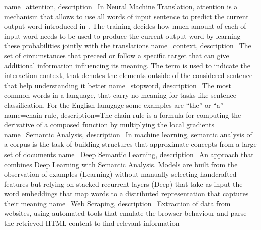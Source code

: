 
{
  name={attention},
  description={In Neural Machine Translation, attention is a mechanism that allows to use all words of input sentence to predict the current output word introduced in \cite{bahdanau2014neural}. The training decides how much amount of each of input word needs to be used to produce the current output word by learning these probabilities jointly with the translations}
}
{
  name={context},
  description={The set of circumstances that preceed or follow a specific target that can give additional information influencing its meaning. The term is used to indicate the interaction context, that denotes the elements outside of the considered sentence that help understanding it better}
}
{
  name={stopword},
  description={The most common words in a language, that carry no meaning for tasks like sentence classification. For the English lanugage some examples are ``the'' or ``a''}
}
{
  name={chain rule},
  description={The chain rule is a formula for computing the derivative of a composed function by multiplying the local gradients}
}
{
  name={Semantic Analysis},
  description={In machine learning, semantic analysis of a corpus is the task of building structures that approximate concepts from a large set of documents}
}
{
  name={Deep Semantic Learning},
  description={An approach that combines Deep Learning with Semantic Analysis. Models are built from the observation of examples (Learning) without manually selecting handcrafted features but relying on stacked recurrent layers (Deep) that take as input the word embeddings that map words to a distributed representation that captures their meaning}
}
{
  name={Web Scraping},
  description={Extraction of data from websites, using automated tools that emulate the browser behaviour and parse the retrieved HTML content to find relevant information}
}
